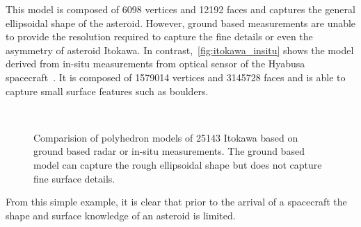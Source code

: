This model is composed of \num{6098} vertices and \num{12192} faces and captures the general ellipsoidal shape of the asteroid.
However, ground based measurements are unable to provide the resolution required to capture the fine details or even the asymmetry of asteroid Itokawa.
In contrast,~\cref{fig:itokawa_insitu} shows the model derived from in-situ measurements from optical sensor of the Hyabusa spacecraft~\cite{gaskell2008a}.
It is composed of \num{1579014} vertices and \num{3145728} faces and is able to capture small surface features such as boulders.
\begin{figure}
    \centering
    ~
    \caption[Comparison of Radar and In-situ Itokawa models]{Comparision of polyhedron models of 25143 Itokawa based on ground based radar or in-situ measurements.
        The ground based model can capture the rough ellipsoidal shape but does not capture fine surface details.}
\end{figure}
From this simple example, it is clear that prior to the arrival of a spacecraft the shape and surface knowledge of an asteroid is limited.


